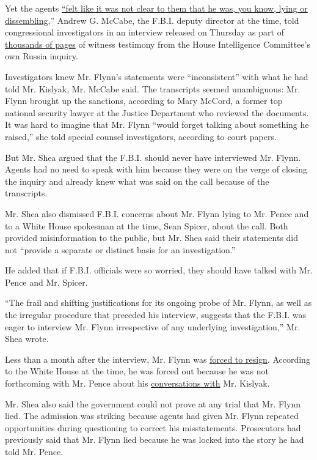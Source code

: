 Yet the agents
\href{https://intelligence.house.gov/uploadedfiles/am33.pdf}{``felt like
it was not clear to them that he was, you know, lying or dissembling},''
Andrew G. McCabe, the F.B.I. deputy director at the time, told
congressional investigators in an interview released on Thursday as part
of \href{https://intelligence.house.gov/russiainvestigation/}{thousands
of pages} of witness testimony from the House Intelligence Committee's
own Russia inquiry.

Investigators knew Mr. Flynn's statements were ``inconsistent'' with
what he had told Mr. Kislyak, Mr. McCabe said. The transcripts seemed
unambiguous: Mr. Flynn brought up the sanctions, according to Mary
McCord, a former top national security lawyer at the Justice Department
who reviewed the documents. It was hard to imagine that Mr. Flynn
``would forget talking about something he raised,'' she told special
counsel investigators, according to court papers.

But Mr. Shea argued that the F.B.I. should never have interviewed Mr.
Flynn. Agents had no need to speak with him because they were on the
verge of closing the inquiry and already knew what was said on the call
because of the transcripts.

Mr. Shea also dismissed F.B.I. concerns about Mr. Flynn lying to Mr.
Pence and to a White House spokesman at the time, Sean Spicer, about the
call. Both provided misinformation to the public, but Mr. Shea said
their statements did not ``provide a separate or distinct basis for an
investigation.''

He added that if F.B.I. officials were so worried, they should have
talked with Mr. Pence and Mr. Spicer.

``The frail and shifting justifications for its ongoing probe of Mr.
Flynn, as well as the irregular procedure that preceded his interview,
suggests that the F.B.I. was eager to interview Mr. Flynn irrespective
of any underlying investigation,'' Mr. Shea wrote.

Less than a month after the interview, Mr. Flynn was
\href{https://www.nytimes.com/2017/02/13/us/politics/donald-trump-national-security-adviser-michael-flynn.html}{forced
to resign}. According to the White House at the time, he was forced out
because he was not forthcoming with Mr. Pence about his
\href{https://www.nytimes.com/interactive/2017/02/14/us/politics/flynn-call-russia-timeline.html}{conversations
with} Mr. Kislyak.

Mr. Shea also said the government could not prove at any trial that Mr.
Flynn lied. The admission was striking because agents had given Mr.
Flynn repeated opportunities during questioning to correct his
misstatements. Prosecutors had previously said that Mr. Flynn lied
because he was locked into the story he had told Mr. Pence.


